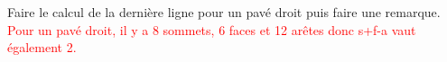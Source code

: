 \begin{corrige}
    \smallskip
    Faire le calcul de la dernière ligne pour un pavé droit puis faire une remarque.
    \textcolor{red}{Pour un pavé droit, il y a 8 sommets, 6 faces et 12 arêtes donc s+f-a vaut également 2.}
\end{corrige}

